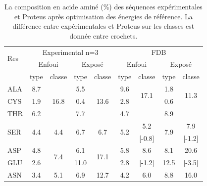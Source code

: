    \begin{table}
     \centering
\caption{La composition en acide aminé (\%) des séquences expérimentales et Proteus après optimisation des énergies de référence. La différence entre expérimentales et Proteus sur les classes est donnée entre crochets.}
\begin{tabular}{l|cccc|cccc}
\hline
\multirow{2}{*}{Res} & \multicolumn{4}{c|}{Experimental n=3}& \multicolumn{4}{c}{FDB}\\
 & \multicolumn{2}{c}{Enfoui} & \multicolumn{2}{c|}{Exposé} & \multicolumn{2}{c}{Enfoui} & \multicolumn{2}{c}{Exposé} \\
\hline
 & type & classe & type & classe & type & classe & type & classe \\
\hline 
ALA                  & 8.7                  &  \multirow{3}{*}{16.8} & 5.5                  & \multirow{3}{*}{13.6}   &   9.6                & \multirow{2}{*}{17.1}    & 1.8 & \multirow{2}{*}{11.3} \\
CYS                  & 1.9                  &                        & 0.4                  &                         &    2.8               & \multirow{2}{*}{[-0.3]}  & 0.6 & \multirow{2}{*}{[2.3]} \\
THR                  & 6.2                  &                        & 7.7                  &                         &    4.7               &                          & 8.9 &                       \\
\hline
\multirow{2}{*}{SER} & \multirow{2}{*}{4.4} & \multirow{2}{*}{4.4}   & \multirow{2}{*}{6.7} & \multirow{2}{*}{6.7}    & \multirow{2}{*}{5.2} & 5.2                      & \multirow{2}{*}{7.9} & 7.9\\
                     &                      &                        &                      &                         &                      &  [-0.8]                  &                      & [-1.2] \\
\hline
ASP                  & 4.8                  & \multirow{2}{*}{7.4}   & 6.1                  & \multirow{2}{*}{17.1}   &   5.8                &  8.6                     & 8.1    & 20.6  \\
GLU                  & 2.6                  &                        & 11.0                 &                         &   2.8                &  [-1.2]                  & 12.5   &  [-3.5] \\
\hline
ASN                  & 3.4                  & \multirow{2}{*}{5.1}   & 6.9                  & \multirow{2}{*}{12.7}   &   4.2                &  6.0                     & 8.8 & 16.0 \\

\end{tabular}
\end{table}
